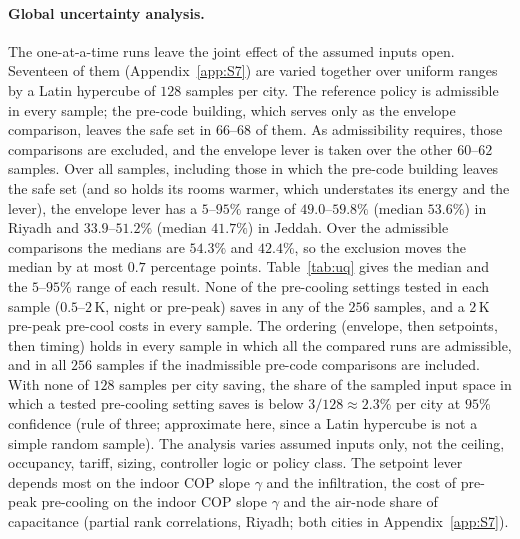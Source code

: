 \documentclass[10pt,a4paper,twocolumn]{article}
\theoremstyle{definition}
\begin{document}
\paragraph{Global uncertainty analysis.}\label{sec:uq} The one-at-a-time runs leave the joint effect of the assumed inputs open. Seventeen of them (Appendix~\ref{app:S7}) are varied together over uniform ranges by a Latin hypercube of $128$ samples per city. The reference policy is admissible in every sample; the pre-code building, which serves only as the envelope comparison, leaves the safe set in $66$--$68$ of them. As admissibility requires, those comparisons are excluded, and the envelope lever is taken over the other $60$--$62$ samples. Over all samples, including those in which the pre-code building leaves the safe set (and so holds its rooms warmer, which understates its energy and the lever), the envelope lever has a $5$--$95\%$ range of $49.0$--$59.8\%$ (median $53.6\%$) in Riyadh and $33.9$--$51.2\%$ (median $41.7\%$) in Jeddah. Over the admissible comparisons the medians are $54.3\%$ and $42.4\%$, so the exclusion moves the median by at most $0.7$ percentage points. Table~\ref{tab:uq} gives the median and the $5$--$95\%$ range of each result. None of the pre-cooling settings tested in each sample ($0.5$--$2\,$K, night or pre-peak) saves in any of the $256$ samples, and a $2\,$K pre-peak pre-cool costs in every sample. The ordering (envelope, then setpoints, then timing) holds in every sample in which all the compared runs are admissible, and in all $256$ samples if the inadmissible pre-code comparisons are included. With none of $128$ samples per city saving, the share of the sampled input space in which a tested pre-cooling setting saves is below $3/128\approx2.3\%$ per city at $95\%$ confidence (rule of three; approximate here, since a Latin hypercube is not a simple random sample). The analysis varies assumed inputs only, not the ceiling, occupancy, tariff, sizing, controller logic or policy class. The setpoint lever depends most on the indoor COP slope $\gamma$ and the infiltration, the cost of pre-peak pre-cooling on the indoor COP slope $\gamma$ and the air-node share of capacitance (partial rank correlations, Riyadh; both cities in Appendix~\ref{app:S7}).
\end{document}
